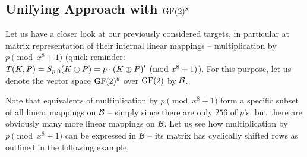 


\subsection{Unifying Approach with $\mathrm{GF}(2)^8$}
\label{sec:unify}

Let us have a closer look at our previously considered targets, in particular at matrix representation of their internal linear mappings -- multiplication by $p\pmod{x^8+1}$ (quick reminder: $T(K,P) = S_{p,0}(K\oplus P) = p \cdot (K\oplus P)' \pmod{x^8+1}$). For this purpose, let us denote the vector space $\mathrm{GF}(2)^8$ over $\mathrm{GF}(2)$ by $\cal B$.

Note that equivalents of multiplication by $p\pmod{x^8+1}$ form a specific subset of all linear mappings on $\cal B$ -- simply since there are only $256$ of $p$'s, but there are obviously many more linear mappings on $\cal B$. Let us see how multiplication by $p\pmod{x^8+1}$ can be expressed in $\cal B$ -- its matrix has cyclically shifted rows as outlined in the following example.

